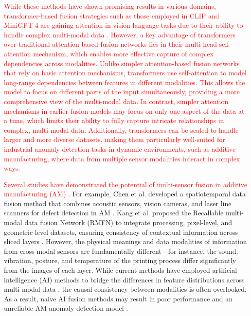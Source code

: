 \documentclass[preprint,12pt]{elsarticle}
\begin{document}
\textcolor{red}{While these methods have shown promising results in various domains, transformer-based fusion strategies such as those employed in CLIP and MiniGPT-4 are gaining attention in vision-language tasks due to their ability to handle complex multi-modal data \cite{RN338}. However, a key advantage of transformers over traditional attention-based fusion networks lies in their multi-head self-attention mechanism, which enables more effective capture of complex dependencies across modalities. Unlike simpler attention-based fusion networks that rely on basic attention mechanisms, transformers use self-attention to model long-range dependencies between features in different modalities. This allows the model to focus on different parts of the input simultaneously, providing a more comprehensive view of the multi-modal data. In contrast, simpler attention mechanisms in earlier fusion models may focus on only one aspect of the data at a time, which limits their ability to fully capture intricate relationships in complex, multi-modal data. Additionally, transformers can be scaled to handle larger and more diverse datasets, making them particularly well-suited for industrial anomaly detection tasks in dynamic environments, such as additive manufacturing, where data from multiple sensor modalities interact in complex ways.}

\textcolor{red}{Several studies have demonstrated the potential of multi-sensor fusion in additive manufacturing (AM) \cite{RN331}.} For example, Chen et al. developed a spatiotemporal data fusion method that combines acoustic sensors, vision cameras, and laser line scanners for defect detection in AM \cite{RN331}. Kang et al. proposed the Recallable multi-modal data fusion Network (RMFN) to integrate processing, pixel-level, and geometric-level datasets, ensuring consistency of contextual information across sliced layers \cite{RN339}. However, the physical meanings and data modalities of information from cross-modal sensors are fundamentally different—for instance, the sound, vibration, posture, and temperature of the printing process differ significantly from the images of each layer. While current methods have employed artificial intelligence (AI) methods to bridge the differences in feature distributions across multi-modal data \cite{RN341, RN340}, the causal consistency between modalities is often overlooked. As a result, naive AI fusion methods may result in poor performance and an unreliable AM anomaly detection model \cite{RN342}.
\end{document}
